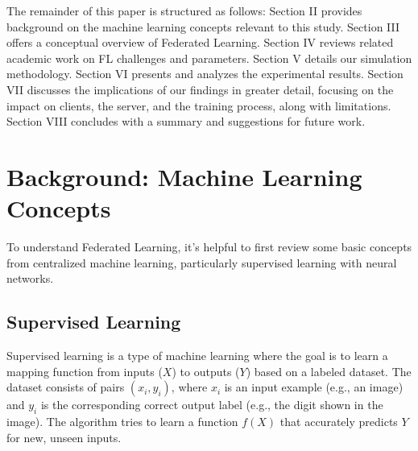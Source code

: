 \documentclass[conference]{IEEEtran}
\begin{document}
The remainder of this paper is structured as follows: Section II provides background on the machine learning concepts relevant to this study. Section III offers a conceptual overview of Federated Learning. Section IV reviews related academic work on FL challenges and parameters. Section V details our simulation methodology. Section VI presents and analyzes the experimental results. Section VII discusses the implications of our findings in greater detail, focusing on the impact on clients, the server, and the training process, along with limitations. Section VIII concludes with a summary and suggestions for future work.

\section{Background: Machine Learning Concepts}
To understand Federated Learning, it's helpful to first review some basic concepts from centralized machine learning, particularly supervised learning with neural networks.

\subsection{Supervised Learning}
Supervised learning is a type of machine learning where the goal is to learn a mapping function from inputs ($X$) to outputs ($Y$) based on a labeled dataset. The dataset consists of pairs $(x_i, y_i)$, where $x_i$ is an input example (e.g., an image) and $y_i$ is the corresponding correct output label (e.g., the digit shown in the image). The algorithm tries to learn a function $f(X)$ that accurately predicts $Y$ for new, unseen inputs.
\end{document}
